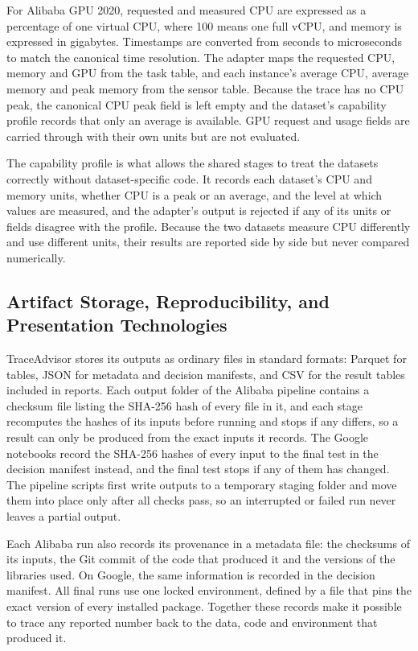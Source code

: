 \documentclass{IEEEtran}
\begin{document}
For Alibaba GPU 2020, requested and measured CPU are expressed as a percentage of one virtual CPU, where 100 means one full vCPU, and memory is expressed in gigabytes. Timestamps are converted from seconds to microseconds to match the canonical time resolution. The adapter maps the requested CPU, memory and GPU from the task table, and each instance's average CPU, average memory and peak memory from the sensor table. Because the trace has no CPU peak, the canonical CPU peak field is left empty and the dataset's capability profile records that only an average is available. GPU request and usage fields are carried through with their own units but are not evaluated.

The capability profile is what allows the shared stages to treat the datasets correctly without dataset-specific code. It records each dataset's CPU and memory units, whether CPU is a peak or an average, and the level at which values are measured, and the adapter's output is rejected if any of its units or fields disagree with the profile. Because the two datasets measure CPU differently and use different units, their results are reported side by side but never compared numerically.

\subsection{Artifact Storage, Reproducibility, and Presentation Technologies}\label{sec:3.5}

TraceAdvisor stores its outputs as ordinary files in standard formats: Parquet for tables, JSON for metadata and decision manifests, and CSV for the result tables included in reports. Each output folder of the Alibaba pipeline contains a checksum file listing the SHA-256 hash of every file in it, and each stage recomputes the hashes of its inputs before running and stops if any differs, so a result can only be produced from the exact inputs it records. The Google notebooks record the SHA-256 hashes of every input to the final test in the decision manifest instead, and the final test stops if any of them has changed. The pipeline scripts first write outputs to a temporary staging folder and move them into place only after all checks pass, so an interrupted or failed run never leaves a partial output.

Each Alibaba run also records its provenance in a metadata file: the checksums of its inputs, the Git commit of the code that produced it and the versions of the libraries used. On Google, the same information is recorded in the decision manifest. All final runs use one locked environment, defined by a file that pins the exact version of every installed package. Together these records make it possible to trace any reported number back to the data, code and environment that produced it.
\end{document}
